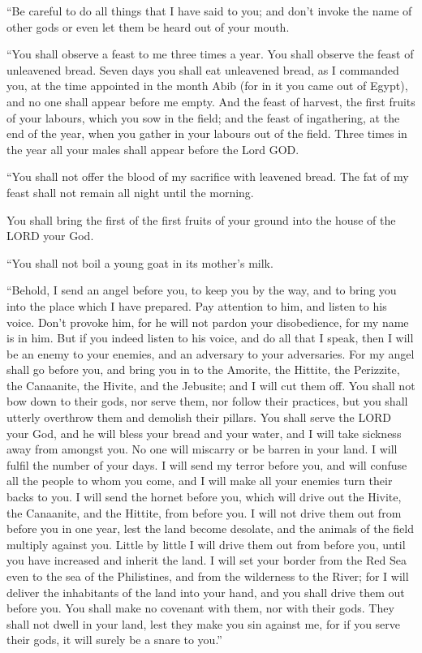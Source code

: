  ``Be careful to do all things that I have said to you;
and don't invoke the name of other gods or even let them be heard out of
your mouth.

 ``You shall observe a feast to me three times a year.
 You shall observe the feast of unleavened bread. Seven
days you shall eat unleavened bread, as I commanded you, at the time
appointed in the month Abib (for in it you came out of Egypt), and no
one shall appear before me empty.  And the feast of
harvest, the first fruits of your labours, which you sow in the field;
and the feast of ingathering, at the end of the year, when you gather in
your labours out of the field.  Three times in the year
all your males shall appear before the Lord GOD.

 ``You shall not offer the blood of my sacrifice with
leavened bread. The fat of my feast shall not remain all night until the
morning.

 You shall bring the first of the first fruits of your
ground into the house of the LORD your God.

``You shall not boil a young goat in its mother's milk.

 ``Behold, I send an angel before you, to keep you by the
way, and to bring you into the place which I have prepared.
 Pay attention to him, and listen to his voice. Don't
provoke him, for he will not pardon your disobedience, for my name is in
him.  But if you indeed listen to his voice, and do all
that I speak, then I will be an enemy to your enemies, and an adversary
to your adversaries.  For my angel shall go before you,
and bring you in to the Amorite, the Hittite, the Perizzite, the
Canaanite, the Hivite, and the Jebusite; and I will cut them off.
 You shall not bow down to their gods, nor serve them,
nor follow their practices, but you shall utterly overthrow them and
demolish their pillars.  You shall serve the LORD your
God, and he will bless your bread and your water, and I will take
sickness away from amongst you.  No one will miscarry or
be barren in your land. I will fulfil the number of your days.
 I will send my terror before you, and will confuse all
the people to whom you come, and I will make all your enemies turn their
backs to you.  I will send the hornet before you, which
will drive out the Hivite, the Canaanite, and the Hittite, from before
you.  I will not drive them out from before you in one
year, lest the land become desolate, and the animals of the field
multiply against you.  Little by little I will drive them
out from before you, until you have increased and inherit the land.
 I will set your border from the Red Sea even to the sea
of the Philistines, and from the wilderness to the River; for I will
deliver the inhabitants of the land into your hand, and you shall drive
them out before you.  You shall make no covenant with
them, nor with their gods.  They shall not dwell in your
land, lest they make you sin against me, for if you serve their gods, it
will surely be a snare to you.''

